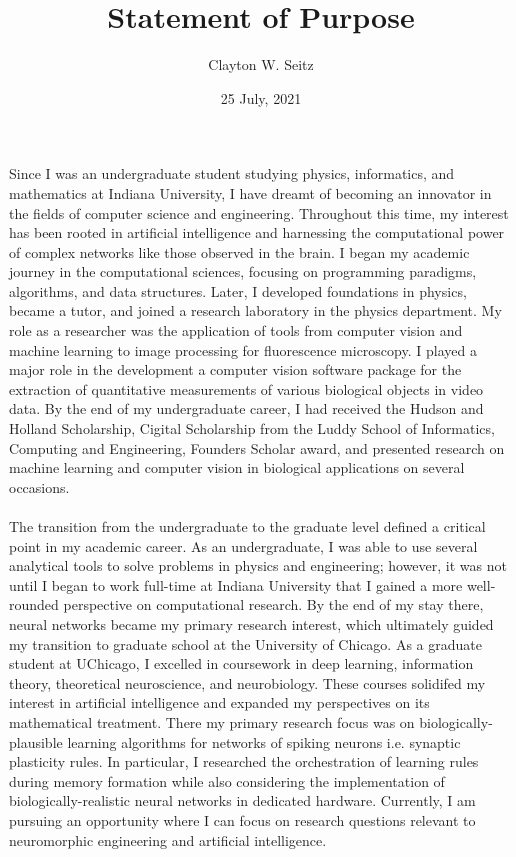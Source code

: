 \documentclass{article}
\title{Statement of Purpose}
\author{Clayton W. Seitz}
\date{25 July, 2021}
\begin{document}
  \maketitle%
\vspace{0.4in}

\indent Since I was an undergraduate student studying physics, informatics, and mathematics at Indiana University, I have dreamt of becoming an innovator in the fields of computer science and engineering. Throughout this time, my interest has been rooted in artificial intelligence and harnessing the computational power of complex networks like those observed in the brain. I began my academic journey in the computational sciences, focusing on programming paradigms, algorithms, and data structures. Later, I developed foundations in physics, became a tutor, and joined a research laboratory in the physics department. My role as a researcher was the application of tools from computer vision and machine learning to image processing for fluorescence microscopy. I played a major role in the development a computer vision software package for the extraction of quantitative measurements of various biological objects in video data. By the end of my undergraduate career, I had received the Hudson and Holland Scholarship, Cigital Scholarship from the Luddy School of Informatics, Computing and Engineering, Founders Scholar award, and presented research on machine learning and computer vision in biological applications on several occasions.\\
\\
\indent  The transition from the undergraduate to the graduate level defined a critical point in my academic career. As an undergraduate, I was able to use several analytical tools to solve problems in physics and engineering; however, it was not until I began to work full-time at Indiana University that I gained a more well-rounded perspective on computational research. By the end of my stay there, neural networks became my primary research interest, which ultimately guided my transition to graduate school at the University of Chicago. As a graduate student at UChicago, I excelled in coursework in deep learning, information theory, theoretical neuroscience, and neurobiology. These courses solidifed my interest in artificial intelligence and expanded my perspectives on its mathematical treatment. There my primary research focus was on biologically-plausible learning algorithms for networks of spiking neurons i.e. synaptic plasticity rules. In particular, I researched the orchestration of learning rules during memory formation while also considering the implementation of biologically-realistic neural networks in dedicated hardware. Currently, I am pursuing an opportunity where I can focus on research questions relevant to neuromorphic engineering and artificial intelligence.\\
\end{document}
